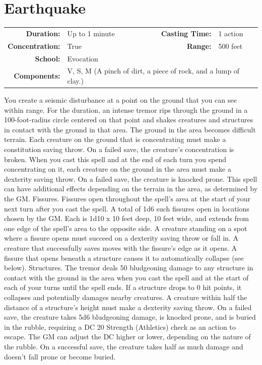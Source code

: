 \documentclass[12pt,showtrims]{memoir}
\begin{document}
\newpage
\section*{Earthquake}

{
\small\centering\vspace{-6pt}
\begin{tabular}{rlrl}
\toprule

\textbf{Duration:} & Up to 1 minute &
\textbf{Casting Time:} & 1 action \\
\textbf{Concentration:} & True &
\textbf{Range:} & 500 feet \\
\textbf{School:} & Evocation \\
\textbf{Components:} & \multicolumn{3}{p{0.7\textwidth}}{V, S, M (A pinch of dirt, a piece of rock, and a lump of clay.)}\\

\bottomrule
\end{tabular}
}

\vspace{1\baselineskip}\noindent You create a seismic disturbance at a point on the ground that you can see within range. For the duration, an intense tremor rips through the ground in a 100-foot-radius circle centered on that point and shakes creatures and structures in contact with the ground in that area. The ground in the area becomes difficult terrain. Each creature on the ground that is concentrating must make a constitution saving throw. On a failed save, the creature's concentration is broken. When you cast this spell and at the end of each turn you spend concentrating on it, each creature on the ground in the area must make a dexterity saving throw. On a failed save, the creature is knocked prone. This spell can have additional effects depending on the terrain in the area, as determined by the GM. Fissures. Fissures open throughout the spell's area at the start of your next turn after you cast the spell. A total of 1d6 such fissures open in locations chosen by the GM. Each is 1d10 x 10 feet deep, 10 feet wide, and extends from one edge of the spell's area to the opposite side. A creature standing on a spot where a fissure opens must succeed on a dexterity saving throw or fall in. A creature that successfully saves moves with the fissure's edge as it opens. A fissure that opens beneath a structure causes it to automatically collapse (see below). Structures. The tremor deals 50 bludgeoning damage to any structure in contact with the ground in the area when you cast the spell and at the start of each of your turns until the spell ends. If a structure drops to 0 hit points, it collapses and potentially damages nearby creatures. A creature within half the distance of a structure's height must make a dexterity saving throw. On a failed save, the creature takes 5d6 bludgeoning damage, is knocked prone, and is buried in the rubble, requiring a DC 20 Strength (Athletics) check as an action to escape. The GM can adjust the DC higher or lower, depending on the nature of the rubble. On a successful save, the creature takes half as much damage and doesn't fall prone or become buried.
\end{document}
